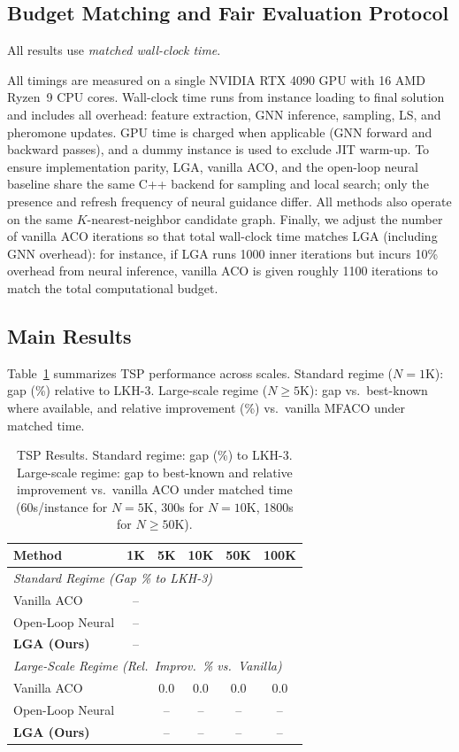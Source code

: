 \documentclass[sigconf,anonymous,review]{acmart}
\theoremstyle{definition}
\theoremstyle{plain}
\newcommand{\TSP}{\textsc{TSP}}
\begin{document}
\subsection{Budget Matching and Fair Evaluation Protocol}
\label{sec:fairness}
All results use \emph{matched wall-clock time}.

All timings are measured on a single NVIDIA RTX 4090 GPU with 16 AMD Ryzen~9 CPU cores.
Wall-clock time runs from instance loading to final solution and includes all overhead: feature extraction, GNN inference, sampling, LS, and pheromone updates.
GPU time is charged when applicable (GNN forward and backward passes), and a dummy instance is used to exclude JIT warm-up.
To ensure implementation parity, LGA, vanilla ACO, and the open-loop neural baseline share the same C++ backend for sampling and local search; only the presence and refresh frequency of neural guidance differ.
All methods also operate on the same $K$-nearest-neighbor candidate graph.
Finally, we adjust the number of vanilla ACO iterations so that total wall-clock time matches LGA (including GNN overhead): for instance, if LGA runs 1000 inner iterations but incurs 10\% overhead from neural inference, vanilla ACO is given roughly 1100 iterations to match the total computational budget.

\subsection{Main Results}
\label{sec:main-results}

Table~\ref{tab:main-tsp} summarizes \TSP{} performance across scales.
Standard regime ($N=1\text{K}$): gap (\%) relative to LKH-3.
Large-scale regime ($N \ge 5\text{K}$): gap vs.\ best-known where available, and relative improvement (\%) vs.\ vanilla MFACO under matched time.

\begin{table}[t]
\centering
\caption{\TSP{} Results. Standard regime: gap (\%) to LKH-3. Large-scale regime: gap to best-known and relative improvement vs.\ vanilla ACO under matched time (60s/instance for $N=5$K, 300s for $N=10$K, 1800s for $N\ge 50$K).}
\label{tab:main-tsp}
\small
\begin{tabular}{lccccc}
\toprule
Method & 1K & 5K & 10K & 50K & 100K \\
\midrule
\multicolumn{6}{l}{\emph{Standard Regime (Gap \% to LKH-3)}} \\
Vanilla ACO & -- & & & & \\
Open-Loop Neural & -- & & & & \\
\textbf{LGA (Ours)} & -- & & & & \\
\midrule
\multicolumn{6}{l}{\emph{Large-Scale Regime (Rel.\ Improv.\ \% vs.\ Vanilla)}} \\
Vanilla ACO & & 0.0 & 0.0 & 0.0 & 0.0 \\
Open-Loop Neural & & -- & -- & -- & -- \\
\textbf{LGA (Ours)} & & -- & -- & -- & -- \\
\bottomrule
\end{tabular}
\end{table}
\end{document}
